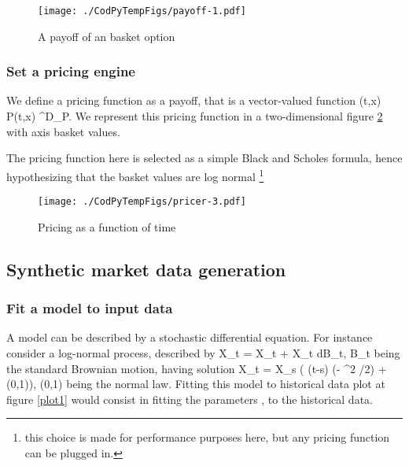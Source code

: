 \documentclass[
]{article}
\def\({}%
\def\){}%
\numberwithin{equation}{section}
\newcommand \RR    {\mathbb{R}}
\begin{document}
\begin{figure}
\centering
\texttt{[image: ./CodPyTempFigs/payoff-1.pdf]}
\caption{\label{plot2} A payoff of an basket option}
\end{figure}

\newpage

\hypertarget{set-a-pricing-engine}{%
\subsubsection{Set a pricing engine}\label{set-a-pricing-engine}}

We define a pricing function as a payoff, that is a vector-valued
function \((t,x) \mapsto P(t,x) \in \RR^{D_P}\). We represent this
pricing function in a two-dimensional figure \ref{plot3} with axis
basket values.

The pricing function here is selected as a simple Black and Scholes
formula, hence hypothesizing that the basket values are log normal
\footnote{this choice is made for performance purposes here, but any pricing function can be plugged in.}

\begin{figure}
\centering
\texttt{[image: ./CodPyTempFigs/pricer-3.pdf]}
\caption{\label{plot3} Pricing as a function of time}
\end{figure}

\newpage

\hypertarget{synthetic-market-data-generation}{%
\subsection{Synthetic market data
generation}\label{synthetic-market-data-generation}}

\hypertarget{fit-a-model-to-input-data}{%
\subsubsection{Fit a model to input
data}\label{fit-a-model-to-input-data}}

A model can be described by a stochastic differential equation. For
instance consider a log-normal process, described by
\(X_t = \mu X_t + X_t \sigma dB_t\), \(B_t\) being the standard Brownian
motion, having solution
\(X_t = X_s \exp( (t-s) (\mu - \sigma^2 /2) +  \sigma {}(0,1))\),
\((0,1)\) being the normal law. Fitting this model to
historical data plot at figure \ref{plot1} would consist in fitting the
parameters \(\mu,\sigma\) to the historical data.
\end{document}
